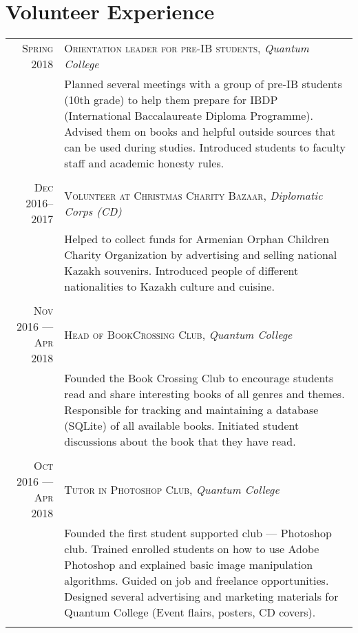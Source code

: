 \documentclass[a4paper,10pt]{article}
\begin{document}
\section{Volunteer Experience}
\begin{tabular}{r|p{11cm}}

\textsc{Spring 2018} &  \textsc{Orientation leader for pre-IB students}, \emph{Quantum College}\\&\footnotesize{Planned several meetings with a group of pre-IB students (10th grade) to help them prepare for IBDP (International Baccalaureate Diploma Programme). Advised them on books and helpful outside sources that can be used during studies. Introduced students to faculty staff and academic honesty rules.} \\\multicolumn{2}{c}{}\\
  
  \textsc{Dec 2016--2017} &  \textsc{Volunteer at Christmas Charity Bazaar}, \emph{Diplomatic Corps (CD)}\\&\footnotesize{Helped to collect funds for Armenian Orphan Children Charity Organization by advertising and selling national Kazakh souvenirs. Introduced people of different nationalities to Kazakh culture and cuisine.} \\\multicolumn{2}{c}{}\\

\textsc{Nov 2016 --- Apr 2018} &  \textsc{Head of BookCrossing Club}, \emph{Quantum College}\\&\footnotesize{Founded the Book Crossing Club to encourage students read and share interesting books of all genres and themes. Responsible for tracking and maintaining a database (SQLite) of all available books. Initiated student discussions about the book that they have read.} \\\multicolumn{2}{c}{}\\

\textsc{Oct 2016 --- Apr 2018} &  \textsc{Tutor in Photoshop Club}, \emph{Quantum College}\\&\footnotesize{Founded the first student supported club --- Photoshop club. Trained enrolled students on how to use Adobe Photoshop and explained basic image manipulation algorithms. Guided on job and freelance opportunities. Designed several advertising and marketing materials for Quantum College (Event flairs, posters, CD covers).} \\\multicolumn{2}{c}{}\\
  
\end{tabular}
\end{document}
